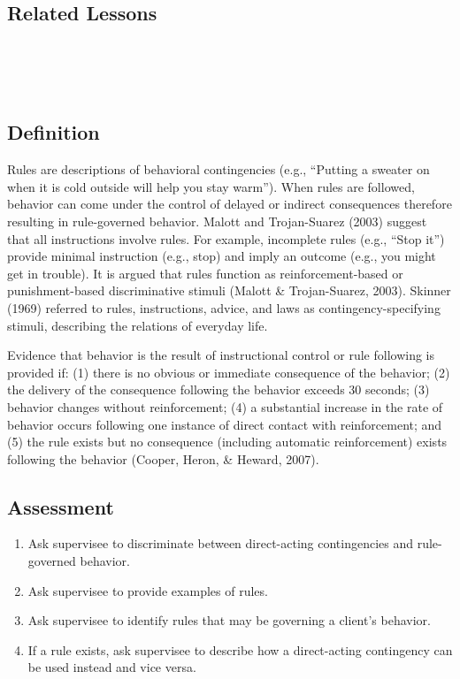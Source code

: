 \subsection{Related Lessons} 
\fourdThree{}\\
\fourdFour{}\\
\fourFKTwentyFour{}\\
%
\subsection{Definition}
Rules are descriptions of behavioral contingencies (e.g., ``Putting a sweater on when it is cold outside will help you stay warm'').  When rules are followed, behavior can come under the control of delayed or indirect consequences therefore resulting in rule-governed behavior.  Malott and Trojan-Suarez (2003) suggest that all instructions involve rules.  For example, incomplete rules (e.g., ``Stop it'') provide minimal instruction (e.g., stop) and imply an outcome (e.g., you might get in trouble).   It is argued that rules function as reinforcement-based or punishment-based discriminative stimuli (Malott \& Trojan-Suarez, 2003). Skinner (1969) referred to rules, instructions, advice, and laws as contingency-specifying stimuli, describing the  relations of everyday life.

Evidence that behavior is the result of instructional control or rule following is provided if: (1) there is no obvious or immediate consequence of the behavior; (2) the delivery of the consequence following the behavior exceeds 30 seconds; (3) behavior changes without reinforcement; (4) a substantial increase in the rate of behavior occurs following one instance of direct contact with reinforcement; and (5) the rule exists but no consequence (including automatic reinforcement) exists following the behavior (Cooper, Heron, \& Heward, 2007).
%
\subsection{Assessment}
\begin{enumerate}
\item Ask supervisee to discriminate between direct-acting contingencies and rule-governed behavior.
\item Ask supervisee to provide examples of rules.
\item Ask supervisee to identify rules that may be governing a client's behavior.
\item If a rule exists, ask supervisee to describe how a direct-acting contingency can be used instead and vice versa.
\end{enumerate}
%

